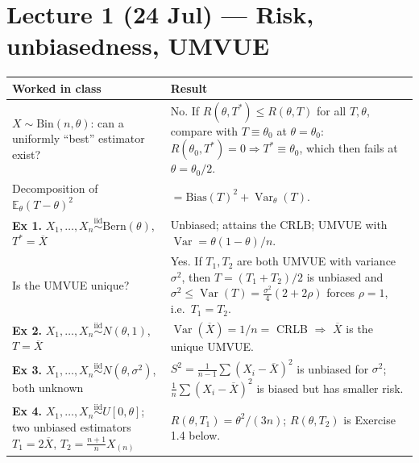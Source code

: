 \documentclass[11pt]{article}
\newcommand{\E}{\mathbb{E}}
\newcommand{\Var}{\operatorname{Var}}
\newcommand{\Xbar}{\overline{X}}
\newcommand{\iid}{\overset{\text{iid}}{\sim}}
\begin{document}
\section*{Lecture 1 (24 Jul) --- Risk, unbiasedness, UMVUE}
\renewcommand{\arraystretch}{1.35}
\begin{longtable}{@{}p{7.2cm}p{9.0cm}@{}}
\toprule
\textbf{Worked in class} & \textbf{Result} \\
\midrule
$X\sim\mathrm{Bin}(n,\theta)$: can a uniformly ``best'' estimator exist? &
No. If $R(\theta,T^*)\le R(\theta,T)$ for all $T,\theta$, compare with $T\equiv\theta_0$ at
$\theta=\theta_0$: $R(\theta_0,T^*)=0\Rightarrow T^*\equiv\theta_0$, which then fails at
$\theta=\theta_0/2$. \\
Decomposition of $\E_\theta(T-\theta)^2$ &
$=\text{Bias}(T)^2+\Var_\theta(T)$. \\
\textbf{Ex 1.} $X_1,\dots,X_n\iid\mathrm{Bern}(\theta)$, $T^*=\Xbar$ &
Unbiased; attains the CRLB; UMVUE with $\Var=\theta(1-\theta)/n$. \\
Is the UMVUE unique? &
Yes. If $T_1,T_2$ are both UMVUE with variance $\sigma^2$, then $T=(T_1+T_2)/2$ is unbiased
and $\sigma^2\le\Var(T)=\tfrac{\sigma^2}{4}(2+2\rho)$ forces $\rho=1$, i.e.\ $T_1=T_2$. \\
\textbf{Ex 2.} $X_1,\dots,X_n\iid N(\theta,1)$, $T=\Xbar$ &
$\Var(\Xbar)=1/n=$ CRLB $\Rightarrow$ $\Xbar$ is the unique UMVUE. \\
\textbf{Ex 3.} $X_1,\dots,X_n\iid N(\theta,\sigma^2)$, both unknown &
$S^2=\tfrac{1}{n-1}\sum(X_i-\Xbar)^2$ is unbiased for $\sigma^2$;
$\tfrac1n\sum(X_i-\Xbar)^2$ is biased but has smaller risk. \\
\textbf{Ex 4.} $X_1,\dots,X_n\iid U[0,\theta]$; two unbiased estimators
$T_1=2\Xbar$, $T_2=\tfrac{n+1}{n}X_{(n)}$ &
$R(\theta,T_1)=\theta^2/(3n)$; $R(\theta,T_2)$ is Exercise 1.4 below. \\
\bottomrule
\end{longtable}
\end{document}
